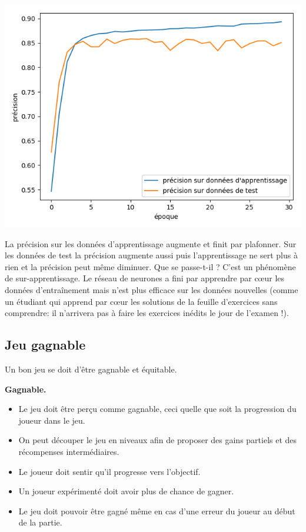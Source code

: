 \documentclass[11pt,class=report,crop=false]{standalone}
\begin{document}
\begin{center}
	\includegraphics[scale=\myscale,scale=0.6]{figures/socio-deepmath}
\end{center}

La précision sur les données d'apprentissage augmente et finit par plafonner.
Sur les données de test la précision augmente aussi puis l'apprentissage ne sert plus à rien et la précision peut même diminuer.
Que se passe-t-il ? C'est un phénomène de sur-apprentissage. Le réseau de neurones a fini par apprendre par c\oe ur les données d'entraînement mais n'est plus efficace sur les données nouvelles (comme un étudiant qui apprend par c\oe ur les solutions de la feuille d'exercices sans comprendre: il n'arrivera pas à faire les exercices inédits le jour de l'examen !).

\subsection{Jeu gagnable}

Un bon jeu se doit d'être \og{}gagnable\fg{} et \og{}équitable\fg{}.

\textbf{Gagnable.} 
\begin{itemize}
	\item Le jeu doit être perçu comme gagnable, ceci quelle que soit la progression du joueur dans le jeu. 
	\item On peut découper le jeu en niveaux afin de proposer des gains partiels et des récompenses intermédiaires. 
	\item Le joueur doit sentir qu'il progresse vers l'objectif. 
	\item Un joueur expérimenté doit avoir plus de chance de gagner.
	\item Le jeu doit pouvoir être gagné même en cas d'une erreur du joueur au début de la partie.
\end{itemize}
\end{document}
